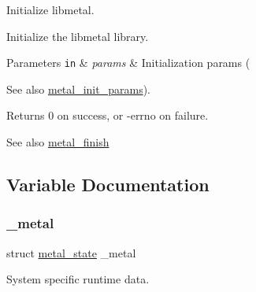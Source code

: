 Initialize libmetal. 

Initialize the libmetal library.


\begin{DoxyParams}[1]{Parameters}
\mbox{\tt in}  & {\em params} & Initialization params (\\
\hline
\end{DoxyParams}
\begin{DoxySeeAlso}{See also}
\hyperlink{structmetal__init__params}{metal\+\_\+init\+\_\+params}).
\end{DoxySeeAlso}
\begin{DoxyReturn}{Returns}
0 on success, or -\/errno on failure.
\end{DoxyReturn}
\begin{DoxySeeAlso}{See also}
\hyperlink{group__system_ga5760e3af70ec9a782c53e8ad9193d66b}{metal\+\_\+finish} 
\end{DoxySeeAlso}


\subsection{Variable Documentation}
\mbox{\label{group__system_ga929f8594b076a54b9773b4ab8ca2327d}} 
\subsubsection{\texorpdfstring{\+\_\+metal}{\_metal}}
{\footnotesize\ttfamily struct \hyperlink{structmetal__state}{metal\+\_\+state} \+\_\+metal}

System specific runtime data. 